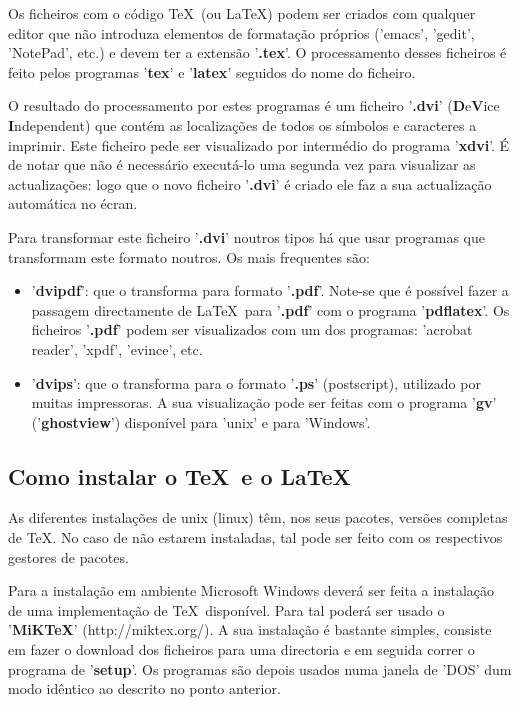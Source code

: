 \documentclass[a4paper,12pt]{article}
\begin{document}
Os ficheiros com o código \TeX\ (ou \LaTeX) podem ser
criados com qualquer editor que não introduza elementos de
formatação próprios ('emacs', 'gedit', 'NotePad', etc.) e devem
ter a extensão '{\bf .tex}'. O processamento desses ficheiros é feito 
pelos programas '{\bf tex}' e '{\bf latex}' seguidos do nome do 
ficheiro.

O resultado do processamento por estes programas é um ficheiro
'{\bf .dvi}' ({\bf D}e{\bf V}ice {\bf I}ndependent) 
que contém as localizações de todos os símbolos e caracteres
a imprimir. Este ficheiro pede ser visualizado por intermédio do programa
'{\bf xdvi}'. É de notar que não é necessário executá-lo uma segunda
vez para visualizar as actualizações: logo que o novo ficheiro 
'{\bf .dvi}' é criado ele faz a sua actualização automática no écran.

Para transformar este ficheiro '{\bf .dvi}' noutros tipos há que
usar programas que transformam este formato noutros. Os mais 
frequentes são:

\begin{itemize}
\item '{\bf dvipdf}': 
que o transforma para formato '{\bf .pdf}'.
Note-se que é possível fazer a passagem directamente de \LaTeX\ 
para '{\bf .pdf}' com o programa '{\bf pdflatex}'. Os ficheiros
'{\bf .pdf}' podem ser visualizados com um dos programas: 
'acrobat reader', 'xpdf', 'evince', etc.
\item '{\bf dvips}': 
que o transforma para o formato '{\bf .ps}'
(postscript), utilizado por muitas impressoras. A sua visualização 
pode ser feitas com o programa '{\bf gv}' ('{\bf ghostview}')
disponível para 'unix' e para 'Windows'.
\end{itemize}

\subsection{Como instalar o \TeX\ e o \LaTeX}

As diferentes instalações de unix (linux) têm, nos seus pacotes,
versões completas de \TeX. No caso de não estarem instaladas, tal
pode ser feito com os respectivos gestores de pacotes.

Para a instalação em ambiente Microsoft Windows deverá ser feita 
a instalação de uma implementação de \TeX\ disponível.
Para tal poderá ser usado o '{\bf MiKTeX}' (http://miktex.org/).
A sua instalação é bastante simples, consiste em fazer o download
dos ficheiros para uma directoria e em seguida correr o programa
de '{\bf setup}'. Os programas são depois usados numa janela de 'DOS'
dum modo idêntico ao descrito no ponto anterior.
\end{document}
